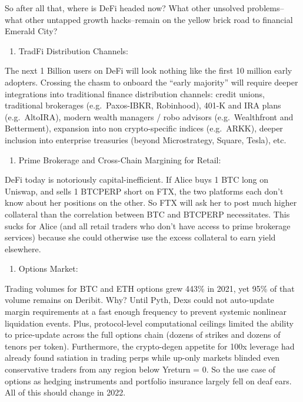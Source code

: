 \documentclass[
]{book}
\providecommand{\tightlist}{%
  \setlength{\itemsep}{0pt}\setlength{\parskip}{0pt}}
\begin{document}
So after all that, where is DeFi headed now? What other unsolved problems--what other untapped growth hacks--remain on the yellow brick road to financial Emerald City?

\begin{enumerate}
\def\labelenumi{(\alph{enumi})}
\tightlist
\item
  TradFi Distribution Channels:
\end{enumerate}

The next 1 Billion users on DeFi will look nothing like the first 10 million early adopters. Crossing the chasm to onboard the ``early majority'' will require deeper integrations into traditional finance distribution channels: credit unions, traditional brokerages (e.g.~Paxos-IBKR, Robinhood), 401-K and IRA plans (e.g.~AltoIRA), modern wealth managers / robo advisors (e.g.~Wealthfront and Betterment), expansion into non crypto-specific indices (e.g.~ARKK), deeper inclusion into enterprise treasuries (beyond Microstrategy, Square, Tesla), etc.

\begin{enumerate}
\def\labelenumi{(\alph{enumi})}
\setcounter{enumi}{1}
\tightlist
\item
  Prime Brokerage and Cross-Chain Margining for Retail:
\end{enumerate}

DeFi today is notoriously capital-inefficient. If Alice buys 1 BTC long on Uniswap, and sells 1 BTCPERP short on FTX, the two platforms each don't know about her positions on the other. So FTX will ask her to post much higher collateral than the correlation between BTC and BTCPERP necessitates. This sucks for Alice (and all retail traders who don't have access to prime brokerage services) because she could otherwise use the excess collateral to earn yield elsewhere.

\begin{enumerate}
\def\labelenumi{(\alph{enumi})}
\setcounter{enumi}{2}
\tightlist
\item
  Options Market:
\end{enumerate}

Trading volumes for BTC and ETH options grew 443\% in 2021, yet 95\% of that volume remains on Deribit. Why? Until Pyth, Dexs could not auto-update margin requirements at a fast enough frequency to prevent systemic nonlinear liquidation events. Plus, protocol-level computational ceilings limited the ability to price-update across the full options chain (dozens of strikes and dozens of tenors per token). Furthermore, the crypto-degen appetite for 100x leverage had already found satiation in trading perps while up-only markets blinded even conservative traders from any region below Yreturn = 0. So the use case of options as hedging instruments and portfolio insurance largely fell on deaf ears. All of this should change in 2022.
\end{document}
